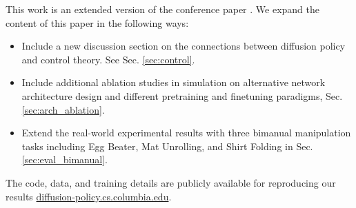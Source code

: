 This work is an extended version of the conference paper \cite{chi2023diffusionpolicy}.  We expand the content of this paper in the following ways:
\begin{itemize} %
\item Include a new discussion section on the connections between diffusion policy and control theory. See Sec. \ref{sec:control}.
\item Include additional ablation studies in simulation on alternative network architecture design and different pretraining and finetuning paradigms, Sec. \ref{sec:arch_ablation}.
\item Extend the real-world experimental results with three bimanual manipulation tasks including  Egg Beater, Mat Unrolling, and Shirt Folding in  Sec. \ref{sec:eval_bimanual}.
\end{itemize}

The code, data, and training details are publicly available for reproducing our results \url{diffusion-policy.cs.columbia.edu}.
